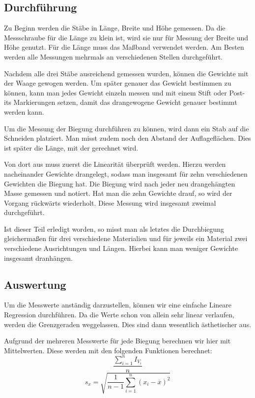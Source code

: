 \documentclass[11pt,a4paper]{article}
\newcommand\mean{\begin{equation}
\frac{\sum_{i=1}^n I_{V_i}}{n}\label{mean}
\end{equation}}
\newcommand\meanstd{\begin{equation}
s_x=\sqrt{\frac{1}{n-1}\sum_{i=1}^n(x_i-\overline{x})^2}\label{meanstd}
\end{equation}}
\begin{document}
\subsection{Durchführung}

Zu Beginn werden die St\"abe in L\"ange, Breite und H\"ohe gemessen. Da die Messschraube f\"ur die L\"ange zu klein ist, wird sie nur f\"ur Messung der Breite und H\"ohe genutzt. F\"ur die L\"ange muss das Ma\ss band verwendet werden. Am Besten werden alle Messungen mehrmals an verschiedenen Stellen durchgef\"uhrt.

Nachdem alle drei St\"abe ausreichend gemessen wurden, k\"onnen die Gewichte mit der Waage gewogen werden. Um sp\"ater genauer das Gewicht bestimmen zu k\"onnen, kann man jedes Gewicht einzeln messen und mit einem Stift oder Post-its Markierungen setzen, damit das drangewogene Gewicht genauer bestimmt werden kann.

Um die Messung der Biegung durchf\"uhren zu k\"onnen, wird dann ein Stab auf die Schneiden platziert. Man misst zudem noch den Abstand der Auflagefl\"achen. Dies ist sp\"ater die L\"ange, mit der gerechnet wird.

Von dort aus muss zuerst die Linearit\"at \"uberpr\"uft werden. Hierzu werden nacheinander Gewichte drangelegt, sodass man insgesamt f\"ur zehn verschiedenen Gewichten die Biegung hat. Die Biegung wird nach jeder neu drangeh\"angten Masse gemessen und notiert. Hat man die zehn Gewichte drauf, so wird der Vorgang r\"uckw\"arts wiederholt. Diese Messung wird insgesamt zweimal durchgef\"uhrt.

Ist dieser Teil erledigt worden, so misst man als letztes die Durchbiegung gleicherma\ss en f\"ur drei verschiedene Materialien und f\"ur jeweils ein Material zwei verschiedene Ausrichtungen und L\"angen. Hierbei kann man weniger Gewichte insgesamt dranh\"angen. 

\pagebreak

\subsection{Auswertung}

Um die Messwerte anst\"andig darzustellen, k\"onnen wir eine einfache Lineare Regression durchf\"uhren. Da die Werte schon von allein sehr linear verlaufen, werden die Grenzgeraden weggelassen. Dies sind dann wesentlich \"asthetischer aus.

Aufgrund der mehreren Messwerte f\"ur jede Biegung berechnen wir hier mit Mittelwerten. Diese werden mit den folgenden Funktionen berechnet:
\mean
\meanstd
\end{document}
